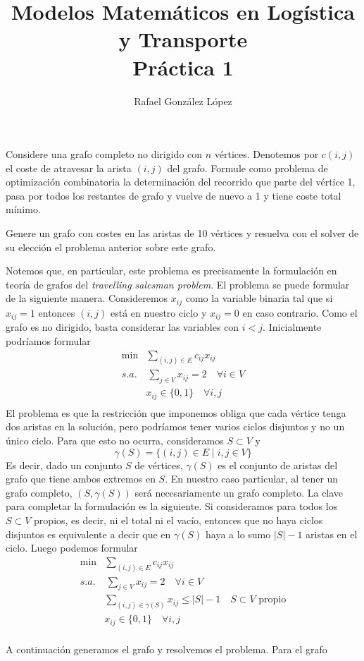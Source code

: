 \documentclass[twoside]{article}
\newenvironment{ejercicio}[1]
  {\renewcommand\theejercicioaux{#1}\ejercicioaux\label{ejer:#1}}
  {\endejercicioaux}
\newenvironment{solucion}{\begin{trivlist}
 \item[\hskip \labelsep {\textit{Solución}.}\hskip \labelsep]}{\end{trivlist}}
\begin{document}
\title{Modelos Matemáticos en Logística y Transporte\\
Práctica 1}
\author{Rafael González López}
\maketitle

\begin{ejercicio}{2}
Considere una grafo completo no dirigido con $n$ vértices. Denotemos por $c(i,j)$ el coste de atravesar la arista $(i,j)$ del grafo. Formule como problema de optimización combinatoria la determinación del recorrido que parte del vértice 1, pasa por todos los restantes de grafo y vuelve de nuevo a 1 y tiene coste total mínimo.

Genere un grafo con costes en las aristas de 10 vértices y resuelva con el solver de su elección el problema anterior sobre este grafo.
\end{ejercicio}

\begin{solucion}
Notemos que, en particular, este problema es precisamente la formulación en teoría de grafos del \textit{travelling salesman problem}. El problema se puede formular de la siguiente manera. Consideremos $x_{ij}$ como la variable binaria tal que si $x_{ij}=1$ entonces $(i,j)$ está en nuestro ciclo y $x_{ij}=0$ en caso contrario. Como el grafo es no dirigido, basta considerar las variables con $i<j$. Inicialmente podríamos formular
\begin{align*}
\min &\sum_{(i,j)\in E} c_{ij}x_{ij}\\
s.a.&\, \sum_{j\in V} x_{ij} = 2 \quad \forall i \in V\\
& x_{ij}\in \{0,1\} \quad \forall i,j\\
\end{align*}
El problema es que la restricción que imponemos obliga que cada vértice tenga dos aristas en la solución, pero podríamos tener varios ciclos disjuntos y no un único ciclo. Para que esto no ocurra, consideramos $S\subset V$ y 
$$
\gamma(S) = \{(i,j) \in E \mid i,j \in V\}
$$ 
Es decir, dado un conjunto $S$ de vértices, $\gamma(S)$ es el conjunto de aristas del grafo que tiene ambos extremos en $S$. En nuestro caso particular, al tener un grafo completo, $(S,\gamma(S))$ será necesariamente un grafo completo. La clave para completar la formulación es la siguiente. Si consideramos para todos los $S\subset V$ propios, es decir, ni el total ni el vacío, entonces que no haya ciclos disjuntos es equivalente a decir que en $\gamma(S)$ haya a lo sumo $|S|-1$ aristas en el ciclo. Luego podemos formular
\begin{align*}
\min &\sum_{(i,j)\in E} c_{ij}x_{ij}\\
s.a.&\, \sum_{j\in V} x_{ij} = 2 \quad \forall i \in V\\
&\sum_{(i,j)\in \gamma(S)} x_{ij} \leq |S|-1 \quad \text{$S\subset V$ propio}\\
& x_{ij}\in \{0,1\} \quad \forall i,j\\
\end{align*}
\end{solucion}
\newpage
A continuación generamos el grafo y resolvemos el problema. Para el grafo 
\end{document}
